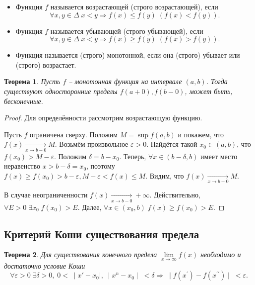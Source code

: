 \documentclass{article}
\newtheorem{Theorem}{Теорема}[section]
\begin{document}
\begin{itemize}
\item Функция $f$ называется возрастающей (строго возрастающей), если
$$\forall x, y \in \Delta \; x < y \Rightarrow f(x) \leq f(y) \; \left(f(x) < f(y)\right).$$
\item Функция $f$ называется убывающей (строго убывающей), если
$$\forall x, y \in \Delta \; x < y \Rightarrow f(x) \geq f(y) \; \left(f(x) > f(y)\right).$$
\item Функция называется (строго) монотонной, если она (строго) убывает или (строго) возрастает.
\end{itemize}
\begin{Theorem}
Пусть $f$ -- монотонная функция на интервале $(a, b)$.
Тогда существуют односторонние пределы $f(a+0), f(b-0)$, может быть, бесконечные.
\end{Theorem}
\begin{proof}
Для определённости рассмотрим возрастающую функцию.

Пусть $f$ ограничена сверху. Положим $M = \sup f(a, b)$ и покажем, что $f(x) \xrightarrow[x \rightarrow b-0]{} M$. Возьмём произвольное $\varepsilon > 0$. Найдётся такой $x_0 \in (a, b)$, что $f(x_0) > M - \varepsilon$.
Положим $\delta = b - x_0$. Теперь, $\forall x \in (b - \delta, b)$ имеет место неравенство $x > b - \delta = x_0$, поэтому $f(x) \geq f(x_0) > b - \varepsilon, M - \varepsilon < f(x) \leq M$. Видим, что $f(x) \xrightarrow[x \rightarrow b - 0]{} M$.

В случае неограниченности $f(x) \xrightarrow[x \rightarrow b - 0]{} +\infty$.
Действительно, $\forall E > 0 \; \exists x_0 \; f(x_0) > E$. Далее, $\forall x \in (x_0, b) \; f(x) \geq f(x_0) > E$.
\end{proof}

\subsection{Критерий Коши существования предела}
\begin{Theorem}
Для существования конечного предела $\lim\limits_{x \to \infty} f(x)$ необходимо и достаточно условие Коши
$$\forall \varepsilon > 0 \; \exists \delta > 0, \; 0 < \; \mid x' - x_0 \mid, \; \mid x^n - x_0 \mid \; < \delta \Rightarrow \; \mid f(x^\prime) - f(x^{\prime\prime}) \mid \; < \varepsilon.$$
\end{Theorem}
\end{document}
